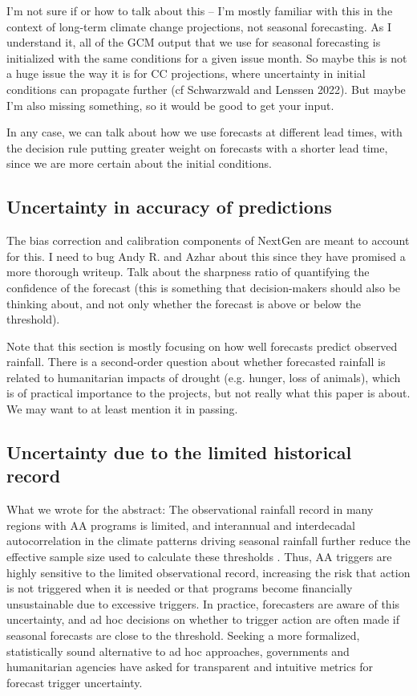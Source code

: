 \documentclass{ametsocV5}
\begin{document}
I'm not sure if or how to talk about this -- I'm mostly familiar with this in the context of long-term climate change projections, not seasonal forecasting. As I understand it, all of the GCM output that we use for seasonal forecasting is initialized with the same conditions for a given issue month. So maybe this is not a huge issue the way it is for CC projections, where uncertainty in initial conditions can propagate further (cf Schwarzwald and Lenssen 2022). But maybe I'm also missing something, so it would be good to get your input. 

In any case, we can talk about how we use forecasts at different lead times, with the decision rule putting greater weight on forecasts with a shorter lead time, since we are more certain about the initial conditions.

\subsection{Uncertainty in accuracy of predictions}

The bias correction and calibration components of NextGen are meant to account for this. I need to bug Andy R. and Azhar about this since they have promised a more thorough writeup. Talk about the sharpness ratio of quantifying the confidence of the forecast (this is something that decision-makers should also be thinking about, and not only whether the forecast is above or below the threshold).

Note that this section is mostly focusing on how well forecasts predict observed rainfall. There is a second-order question about whether forecasted rainfall is related to humanitarian impacts of drought (e.g. hunger, loss of animals), which is of practical importance to the projects, but not really what this paper is about. We may want to at least mention it in passing. 

\subsection{Uncertainty due to the limited historical record}

What we wrote for the abstract: The observational rainfall record in many regions with AA programs is limited, and interannual and interdecadal autocorrelation in the climate patterns driving seasonal rainfall further reduce the effective sample size used to calculate these thresholds \citep{martinez_seasonal_2022}. Thus, AA triggers are highly sensitive to the limited observational record, increasing the risk that action is not triggered when it is needed or that programs become financially unsustainable due to excessive triggers. In practice, forecasters are aware of this uncertainty, and ad hoc decisions on whether to trigger action are often made if seasonal forecasts are close to the threshold. Seeking a more formalized, statistically sound alternative to ad hoc approaches, governments and humanitarian agencies have asked for transparent and intuitive metrics for forecast trigger uncertainty.
\end{document}
